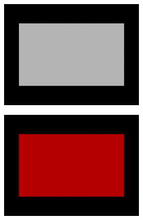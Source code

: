 \begin{figure}
    \centering    
    \begin{subfigure}{\textwidth}
        \centering
        \begin{subfigure}{0.24\textwidth}
            \centering
            \includegraphics[width=\textwidth]{images/02-spd_intuition-white_white.jpg}
        \end{subfigure}
        \hfill
        \begin{subfigure}{0.24\textwidth}
            \centering
            \includegraphics[width=\textwidth]{images/02-spd_intuition-white_red.jpg}
        \end{subfigure}
        \hfill
        \begin{subfigure}{0.24\textwidth}

\end{subfigure}
\end{subfigure}
\end{figure}
